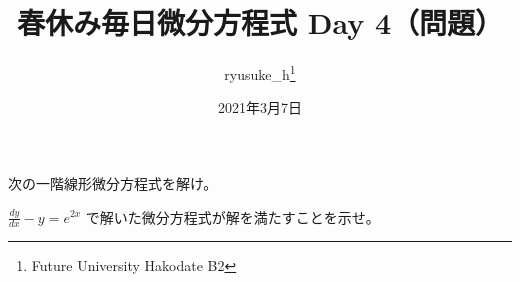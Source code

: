 \documentclass[a4j]{jsarticle}
\title{春休み毎日微分方程式 Day 4（問題）}
\author{ryusuke\_h\thanks{Future University Hakodate B2}}
\date{2021年3月7日}
\begin{document}
\begin{spacing}{1.6}
\maketitle

次の一階線形微分方程式を解け。
\begin{qparts}
    \qpart $ \displaystyle \frac{dy}{dx} - y = e ^ {2x} $
     で解いた微分方程式が解を満たすことを示せ。
\end{qparts}
\end{spacing}
\end{document}
